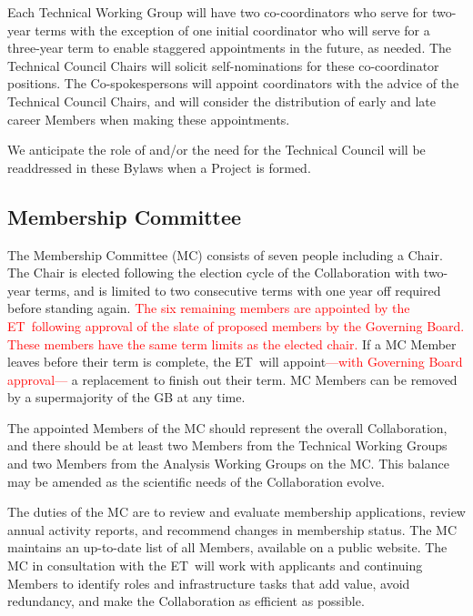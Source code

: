 \documentclass[12pt]{article}
\newcommand{\Comment}[1]{\textcolor{Blue}{(Comment: #1)}}
\newcommand{\exec}{{Executive Team}}
\newcommand{\shorte}{{ET}}  %
\begin{document}
Each Technical Working Group will have two co-coordinators who serve for two-year terms with the exception of one initial coordinator who will serve for a three-year term to enable staggered appointments in the future, as needed.  The Technical Council Chairs will solicit self-nominations for these co-coordinator positions. The Co-spokespersons will appoint coordinators with the advice of the Technical Council Chairs, and will consider the distribution of early and late career Members when making these appointments.

We anticipate the role of and/or the need for the Technical Council will be readdressed in these Bylaws when a Project is formed.

\subsection{Membership Committee}

The Membership Committee (MC) consists of seven people including a Chair. The Chair is elected following the election cycle of the Collaboration with  two-year terms, and is limited to two consecutive terms with one year off required before standing again. \textcolor{red}{The six remaining members are appointed by the \shorte\ following approval of the slate of proposed members by the Governing Board.  These members have the same term limits as the elected chair.} If a MC Member leaves before their term is complete, the \shorte\ will appoint\textcolor{red}{---with Governing Board approval---} a replacement to finish out their term.  MC Members can be removed by a supermajority of the GB at any time.  


The appointed Members of the MC should represent the overall Collaboration, and there should be at least two Members from the Technical Working Groups and two Members from the Analysis Working Groups on the MC.  This balance may be amended as the scientific needs of the Collaboration evolve. %

The duties of the MC  are to review and evaluate membership applications, review annual activity reports, and recommend changes in membership status. The MC maintains an up-to-date list of all Members, available on a public website.  The MC in consultation with the \shorte\ will work with applicants and continuing Members to identify roles and infrastructure tasks that add value, avoid redundancy, and make the Collaboration as efficient as possible.  
\end{document}
